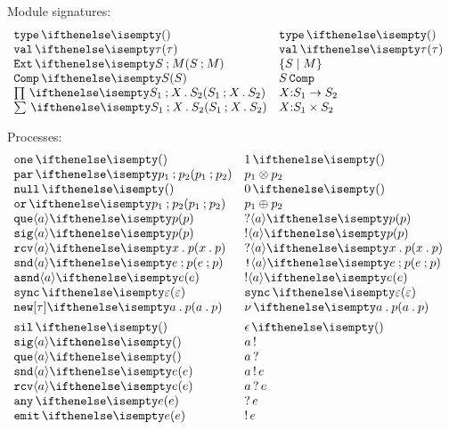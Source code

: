 \documentclass[11pt,twoside]{article}
\begin{document}
\noindent Module signatures:
\begin{displaymath}
  \begin{array}{l@{\quad}l@{\quad}l}
    \univSg  & \univSg* \\
    \valSg{\tau} & \valSg*{\tau} \\
    \extSg{S}{M} & \extSg*{S}{M} \\
    \compSg{S}  & \compSg*{S} \\
    \piSg{S_1}{X}{S_2} & \piSg*{S_1}{X}{S_2} \\
    \sigSg{S_1}{X}{S_2} & \sigSg*{S_1}{X}{S_2}
  \end{array}
\end{displaymath}

\noindent Processes:
\begin{displaymath}
  \begin{array}{l@{\quad}l@{\quad}l}
    \unitProc{}    & \unitProc*{} \\
    \parProc{p_1}{p_2} & \parProc*{p_1}{p_2} \\
    \nullProc{} & \nullProc*{} \\
    \orProc{p_1}{p_2}  & \orProc*{p_1}{p_2} \\
    \queProc{a}{p} & \queProc*{a}{p} \\
    \sigProc{a}{p}  & \sigProc*{a}{p} \\
    \rcvProc{a}{x}{p} & \rcvProc*{a}{x}{p} \\
    \sndProc{a}{e}{p} & \sndProc*{a}{e}{p} \\
    \asndProc{a}{e} & \asndProc*{a}{e} \\
    \syncProc{\varepsilon} & \syncProc*{\varepsilon} \\
    \newProc{a}{p} & \newProc*{a}{p} \\[1ex]
    \silAct & \silAct* \\
    \sigAct{a} & \sigAct*{a} \\
    \queAct{a}  & \queAct*{a} \\
    \sndAct{a}{e} & \sndAct*{a}{e} \\
    \rcvAct{a}{e} & \rcvAct*{a}{e} \\
    \anyAct{e}  & \anyAct*{e} \\
    \emitAct{e} & \emitAct*{e}
  \end{array}
\end{displaymath}
\end{document}
